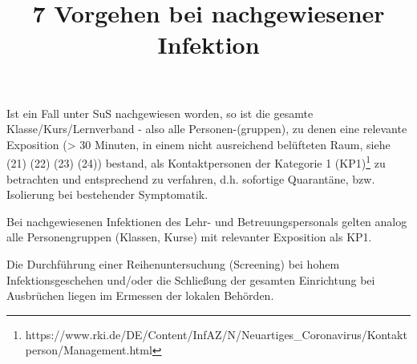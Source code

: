 \documentclass{article}
\begin{document}
\title{7 Vorgehen bei nachgewiesener Infektion}

\maketitle


Ist ein Fall unter SuS nachgewiesen worden, so ist die gesamte Klasse/Kurs/Lernverband - also alle Personen-(gruppen), zu denen eine relevante Exposition (> 30 Minuten, in einem nicht ausreichend belüfteten Raum, siehe (21) (22) (23) (24)) bestand, als Kontaktpersonen der Kategorie 1 (KP1)\footnote{https://www.rki.de/DE/Content/InfAZ/N/Neuartiges\_Coronavirus/Kontaktperson/Management.html} zu betrachten und entsprechend zu verfahren, d.h. sofortige Quarantäne, bzw. Isolierung bei bestehender Symptomatik. 


Bei nachgewiesenen Infektionen des Lehr- und Betreuungspersonals gelten analog alle Personengruppen (Klassen, Kurse) mit relevanter Exposition als KP1. 


Die Durchführung einer Reihenuntersuchung (Screening) bei hohem Infektionsgeschehen und/oder die Schließung der gesamten Einrichtung bei Ausbrüchen liegen im Ermessen der lokalen Behörden.
\end{document}
